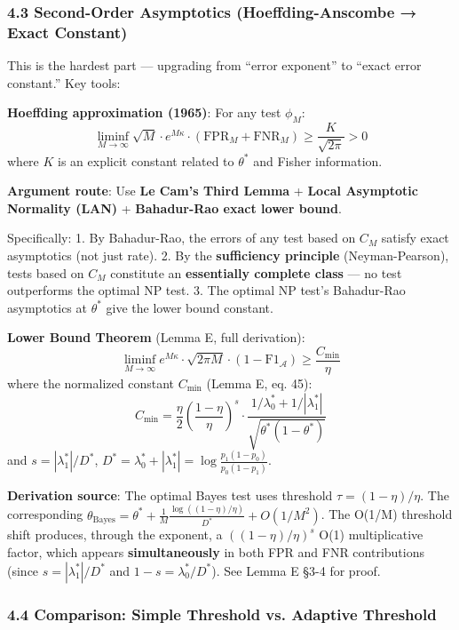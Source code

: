 \documentclass[
  12pt,
]{article}
\begin{document}
\subsubsection{4.3 Second-Order Asymptotics (Hoeffding-Anscombe → Exact Constant)}\label{second-order-asymptotics}

This is the hardest part — upgrading from ``error exponent'' to ``exact error constant.'' Key tools:

\textbf{Hoeffding approximation (1965)}: For any test \(\phi_M\):
\[\liminf_{M\to\infty} \sqrt{M} \cdot e^{M\kappa} \cdot (\text{FPR}_M + \text{FNR}_M) \geq \frac{K}{\sqrt{2\pi}} > 0\]
where \(K\) is an explicit constant related to \(\theta^*\) and Fisher information.

\textbf{Argument route}: Use \textbf{Le Cam's Third Lemma} + \textbf{Local Asymptotic Normality (LAN)} + \textbf{Bahadur-Rao exact lower bound}.

Specifically: 1. By Bahadur-Rao, the errors of any test based on \(C_M\) satisfy exact asymptotics (not just rate). 2. By the \textbf{sufficiency principle} (Neyman-Pearson), tests based on \(C_M\) constitute an \textbf{essentially complete class} — no test outperforms the optimal NP test. 3. The optimal NP test's Bahadur-Rao asymptotics at \(\theta^*\) give the lower bound constant.

\textbf{Lower Bound Theorem} (Lemma E, full derivation):
\[\liminf_{M\to\infty} e^{M\kappa} \cdot \sqrt{2\pi M} \cdot (1 - \text{F1}_{\mathcal{A}}) \geq \frac{C_{\min}}{\eta}\]
where the normalized constant \(C_{\min}\) (Lemma E, eq. 45):
\[\boxed{C_{\min} = \frac{\eta}{2} \left(\frac{1-\eta}{\eta}\right)^{s} \cdot \frac{1/\lambda_0^* + 1/|\lambda_1^*|}{\sqrt{\theta^*(1-\theta^*)}}}\]
and \(s = |\lambda_1^*|/D^*\), \(D^* = \lambda_0^* + |\lambda_1^*| = \log\frac{p_1(1-p_0)}{p_0(1-p_1)}\).

\textbf{Derivation source}: The optimal Bayes test uses threshold \(\tau = (1-\eta)/\eta\). The corresponding \(\theta_{\text{Bayes}} = \theta^* + \frac{1}{M}\frac{\log((1-\eta)/\eta)}{D^*} + O(1/M^2)\). The O(1/M) threshold shift produces, through the exponent, a \(((1-\eta)/\eta)^s\) O(1) multiplicative factor, which appears \textbf{simultaneously} in both FPR and FNR contributions (since \(s = |\lambda_1^*|/D^*\) and \(1-s = \lambda_0^*/D^*\)). See Lemma E §3-4 for proof.

\subsubsection{4.4 Comparison: Simple Threshold vs. Adaptive Threshold}\label{comparison-simple-vs-adaptive}
\end{document}
